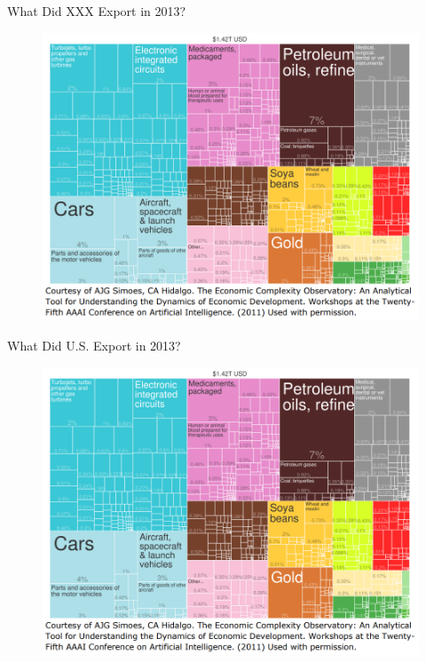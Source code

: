 \documentclass[10pt,hyperref={CJKbookmarks=true},xcolor=dvipsnames,aspectratio=169]{beamer}
\begin{document}
\begin{frame}{What Did XXX Export in 2013?}


\begin{figure}


\includegraphics[scale=0.35]{fig/gravity/com2-1.PNG}

\end{figure}

\end{frame}

\begin{frame}{What Did U.S. Export in 2013?}


\begin{figure}
\includegraphics[scale=0.35]{fig/gravity/com2-1.PNG}
\end{figure}

\end{frame}
\end{document}
